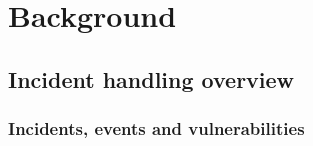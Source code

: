 \chapter{Background}
\section{Incident handling overview}
\subsection{Incidents, events and vulnerabilities}
